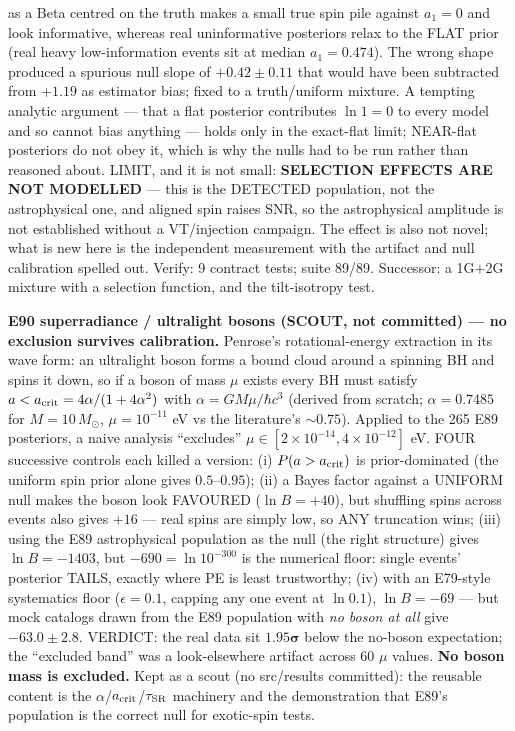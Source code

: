 \documentclass[10pt]{article}
\newcommand{\entry}[2]{\vspace{5pt}\noindent\textbf{#1}\quad #2\par}
\begin{document}
{as a Beta centred on the truth makes a small true spin pile against $a_1=0$ and look informative, whereas
real uninformative posteriors relax to the FLAT prior (real heavy low-information events sit at median
$a_1=0.474$). The wrong shape produced a spurious null slope of $+0.42\pm0.11$ that would have been
subtracted from $+1.19$ as estimator bias; fixed to a truth/uniform mixture. A tempting analytic argument
--- that a flat posterior contributes $\ln 1=0$ to every model and so cannot bias anything --- holds only
in the exact-flat limit; NEAR-flat posteriors do not obey it, which is why the nulls had to be run rather
than reasoned about. LIMIT, and it is not small: \textbf{SELECTION EFFECTS ARE NOT MODELLED} --- this is the
DETECTED population, not the astrophysical one, and aligned spin raises SNR, so the astrophysical amplitude
is not established without a VT/injection campaign. The effect is also not novel; what is new here is the
independent measurement with the artifact and null calibration spelled out. Verify: 9 contract tests;
suite 89/89. Successor: a 1G$+$2G mixture with a selection function, and the tilt-isotropy test.}

\entry{E90 superradiance / ultralight bosons (SCOUT, not committed) --- no exclusion survives calibration.}{
Penrose's rotational-energy extraction in its wave form: an ultralight boson forms a bound cloud around a
spinning BH and spins it down, so if a boson of mass $\mu$ exists every BH must satisfy
$a<a_{\rm crit}=4\alpha/(1+4\alpha^2)$ with $\alpha=GM\mu/\hbar c^3$ (derived from scratch; $\alpha=0.7485$
for $M=10\,M_\odot$, $\mu=10^{-11}$ eV vs the literature's ${\sim}0.75$). Applied to the 265 E89 posteriors,
a naive analysis ``excludes'' $\mu\in[2\times10^{-14},4\times10^{-12}]$ eV. FOUR successive controls each
killed a version: (i) $P(a>a_{\rm crit})$ is prior-dominated (the uniform spin prior alone gives
$0.5$--$0.95$); (ii) a Bayes factor against a UNIFORM null makes the boson look FAVOURED ($\ln B=+40$), but
shuffling spins across events also gives $+16$ --- real spins are simply low, so ANY truncation wins; (iii)
using the E89 astrophysical population as the null (the right structure) gives $\ln B=-1403$, but
$-690=\ln 10^{-300}$ is the numerical floor: single events' posterior TAILS, exactly where PE is least
trustworthy; (iv) with an E79-style systematics floor ($\epsilon=0.1$, capping any one event at $\ln 0.1$),
$\ln B=-69$ --- but mock catalogs drawn from the E89 population with \emph{no boson at all} give
$-63.0\pm2.8$. VERDICT: the real data sit $\mathbf{1.95\sigma}$ below the no-boson expectation; the
``excluded band'' was a look-elsewhere artifact across 60 $\mu$ values. \textbf{No boson mass is excluded.}
Kept as a scout (no src/results committed): the reusable content is the $\alpha$/$a_{\rm crit}$/$\tau_{\rm SR}$
machinery and the demonstration that E89's population is the correct null for exotic-spin tests.}
\end{document}
